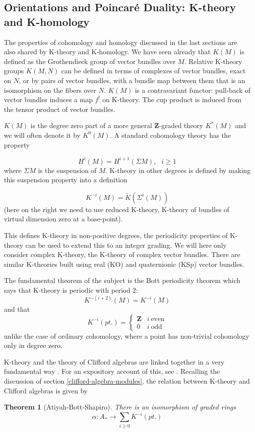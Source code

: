 \documentclass[a4paper,a4paper]{article}
\newtheorem{theorem}{Theorem}
\theoremstyle{conjecture}
\begin{document}
\subsection{Orientations and Poincar\'e Duality: K-theory and K-homology}

The properties of cohomology and homology discussed in the last sections
are also shared by K-theory and K-homology.  We have seen already that
$K(M)$ is defined as the Grothendieck group of vector bundles over $M$. Relative
K-theory groups $K(M,N)$ can be defined in terms of complexes of vector bundles,
exact on $N$, or by pairs of vector bundles, with a bundle map between them that
is an isomorphism on the fibers over $N$. $K(M)$ is a contravariant functor: 
pull-back of vector bundles induces a map $f^!$ on K-theory.
The cup product is induced from the tensor product of
vector bundles.

$K(M)$ is the degree zero part of a more general $\mathbf Z$-graded theory
$K^*(M)$ and we will often denote it by $K^0(M)$.  
A standard cohomology theory has the property

$$H^i(M)=H^{i+1}(\Sigma M), \ \ \ i\ge 1$$
where $\Sigma M$ is the suspension of $M$. 
K-theory in other degrees
is defined by making this suspension property into a definition

$$K^{-i}(M)=\widetilde K(\Sigma ^i (M))$$
(here on the right we need to use reduced K-theory, K-theory
of bundles of virtual dimension zero at a base-point).

This defines K-theory in non-positive degrees, the periodicity properties
of K-theory can be used to extend this to an integer grading.  We will 
here only consider complex K-theory, the K-theory of complex vector bundles.
There are similar K-theories built using real (KO) and quaternionic (KSp)
vector bundles.

The fundamental theorem of the subject is the Bott periodicity theorem
which says that K-theory is periodic with period 2:
$$K^{-(i+2)}(M)=K^{-i}(M)$$
and that
\begin{equation*}
K^{-i}(pt.)=
\begin{cases}
\mathbf Z &i\ \text{even}\\
0 &i\ \text{odd}
\end{cases}
\end{equation*}
unlike the case of ordinary cohomology, where a point has non-trivial cohomology only
in degree zero.

K-theory and the theory of Clifford algebras are linked together in a
very fundamental way \cite{ABS}.  For an expository account of this, see \cite{L-M}.
Recalling the discussion of section \ref{clifford-algebra-modules}, the relation between
K-theory and Clifford algebras is given by 
\begin{theorem}[Atiyah-Bott-Shapiro]
There is an isomorphism of graded rings
$$\alpha:A_*\rightarrow \sum_{i\ge 0}K^{-i}(pt.)$$
\end{theorem}
\end{document}
